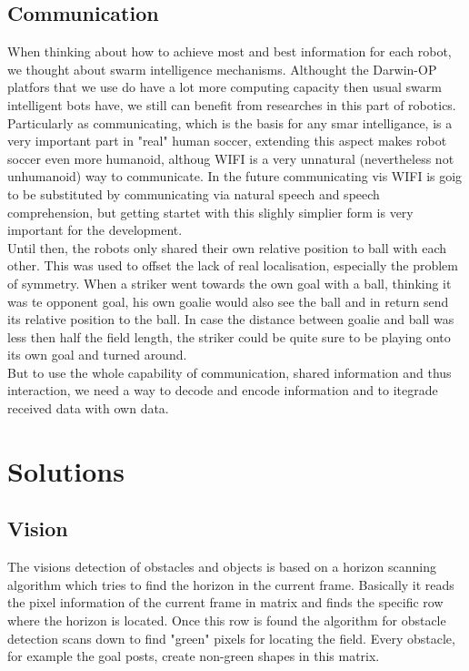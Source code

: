 \documentclass[lnicst,a4paper]{svmultln}
\begin{document}
\subsection{Communication}
\label{sec:problems_communication}
When thinking about how to achieve most and best information for each robot, we thought about swarm intelligence mechanisms. Althought the Darwin-OP platfors that we use do have a lot more computing capacity then usual swarm intelligent bots have, we still can benefit from researches in this part of robotics. 
\\
Particularly as communicating, which is the basis for any smar intelligance, is a very important part in "real" human soccer, extending this aspect makes robot soccer even more humanoid, althoug WIFI is a very unnatural (nevertheless not unhumanoid) way to communicate. In the future communicating vis WIFI is goig to be substituted by communicating via natural speech and speech comprehension, but getting startet with this slighly simplier form is very important for the development.
\\
Until then, the robots only shared their own relative position to ball with each other. This was used to offset the lack of real localisation, especially the problem of symmetry. When a striker went towards the own goal with a ball, thinking it was te opponent goal, his own goalie would also see the ball and in return send its relative position to the ball. In case the distance between goalie and ball was less then half the field length, the striker could be quite sure to be playing onto its own goal and turned around. 
\\
But to use the whole capability of communication, shared information and thus interaction, we need a way to decode and encode information and to itegrade received data with own data.





\section{Solutions}






\subsection{Vision}
\label{sec:solutions_vision}
The visions detection of obstacles and objects is based on a horizon scanning algorithm which tries to find the horizon in the current frame. Basically it reads the pixel information of the current frame in matrix and finds the specific row where the horizon is located.
Once this row is found the algorithm for obstacle detection scans down to find "green" pixels for locating the field. Every obstacle, for example the goal posts, create non-green shapes in this matrix.
\end{document}
